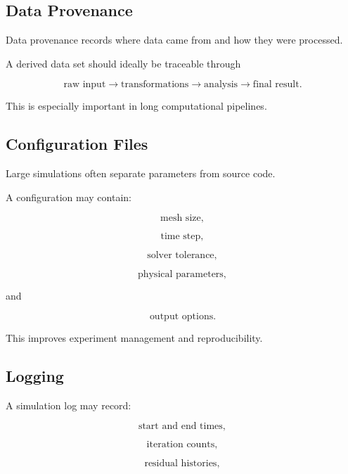 \subsection{Data Provenance}
\label{subsec:data-provenance}

Data provenance records where data came from and how they were processed.

A derived data set should ideally be traceable through

\[
\boxed{
\text{raw input}
\rightarrow
\text{transformations}
\rightarrow
\text{analysis}
\rightarrow
\text{final result}.
}
\]

This is especially important in long computational pipelines.

\subsection{Configuration Files}
\label{subsec:scientific-configuration-files}

Large simulations often separate parameters from source code.

A configuration may contain:

\[
\boxed{
\text{mesh size},
}
\]

\[
\boxed{
\text{time step},
}
\]

\[
\boxed{
\text{solver tolerance},
}
\]

\[
\boxed{
\text{physical parameters},
}
\]

and

\[
\boxed{
\text{output options}.
}
\]

This improves experiment management and reproducibility.

\subsection{Logging}
\label{subsec:scientific-logging}

A simulation log may record:

\[
\boxed{
\text{start and end times},
}
\]

\[
\boxed{
\text{iteration counts},
}
\]

\[
\boxed{
\text{residual histories},
}
\]

